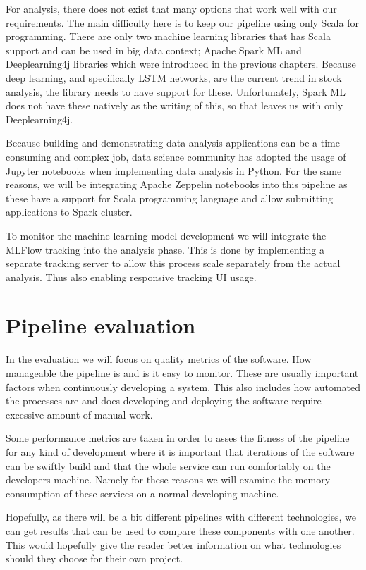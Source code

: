 For analysis, there does not exist that many options that work well with our requirements.
The main difficulty here is to keep our pipeline using only Scala for programming.
There are only two machine learning libraries that has Scala support and can be used in big data context; Apache Spark ML and Deeplearning4j libraries which were introduced in the previous chapters.
Because deep learning, and specifically LSTM networks, are the current trend in stock analysis, the library needs to have support for these.
Unfortunately, Spark ML does not have these natively as the writing of this, so that leaves us with only Deeplearning4j.

Because building and demonstrating data analysis applications can be a time consuming and complex job, data science community has adopted the usage of Jupyter notebooks when implementing data analysis in Python.
For the same reasons, we will be integrating Apache Zeppelin notebooks into this pipeline as these have a support for Scala programming language and allow submitting applications to Spark cluster.

To monitor the machine learning model development we will integrate the MLFlow tracking into the analysis phase.
This is done by implementing a separate tracking server to allow this process scale separately from the actual analysis.
Thus also enabling responsive tracking UI usage.

\section{Pipeline evaluation}

In the evaluation we will focus on quality metrics of the software.
How manageable the pipeline is and is it easy to monitor.
These are usually important factors when continuously developing a system.
This also includes how automated the processes are and does developing and deploying the software require excessive amount of manual work.

Some performance metrics are taken in order to asses the fitness of the pipeline for any kind of development where it is important that iterations of the software can be swiftly build and that the whole service can run comfortably on the developers machine.
Namely for these reasons we will examine the memory consumption of these services on a normal developing machine.

Hopefully, as there will be a bit different pipelines with different technologies, we can get results that can be used to compare these components with one another.
This would hopefully give the reader better information on what technologies should they choose for their own project.
